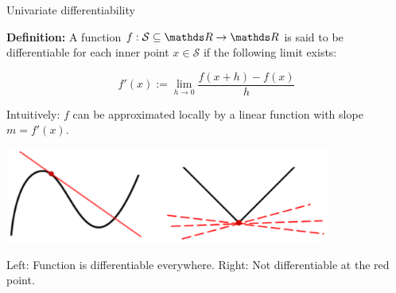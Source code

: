 \begin{vbframe}{Univariate differentiability}

\textbf{Definition:} A function $f: \mathcal{S} \subseteq \R \to \R$ is said to be differentiable for each inner point $x \in \mathcal{S}$ if the following limit exists:

$$
f'(x) := \lim_{h \to 0} \frac{f(x + h) - f(x)}{h}
$$

Intuitively: $f$ can be approximated locally by a linear function with slope $m = f'(x)$. 

\begin{center}
\includegraphics[width = 0.8\textwidth]{figure_man/tangent.png} \\
\begin{footnotesize}
Left: Function is differentiable everywhere. Right: Not differentiable at the red point. 
\end{footnotesize}
\end{center}








\end{vbframe}


